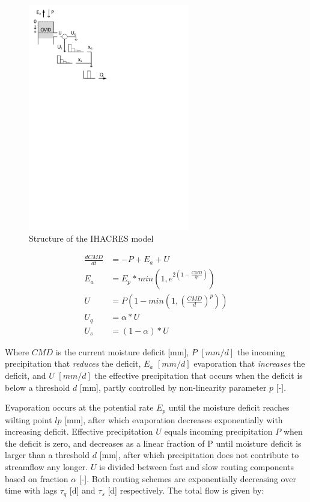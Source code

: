 { 																	%
\begin{figure}
\includegraphics[trim=1cm 20cm 7cm 1cm,width=7cm,keepaspectratio]{./AppA_files/05_schematic.pdf}
\caption{Structure of the IHACRES model} \label{fig:05_schematic}
\end{figure}

\begin{align}
	\frac{dCMD}{dt} &= -P+E_a+U \\
	E_a &= E_p *min\left(1,e^{2\left(1-\frac{CMD}{lp}\right)}\right) \\
	U &= P\left(1-min\left(1,\left(\frac{CMD}{d}\right)^p\right)\right) \\
	U_q &= \alpha *U\\
	U_s &= (1-\alpha)*U
\end{align}

Where $CMD$ is the current moisture deficit [mm], $P$ $[mm/d]$ the incoming precipitation that \emph{reduces} the deficit, $E_a$ $[mm/d]$ evaporation that \emph{increases} the deficit, and $U$ $[mm/d]$ the effective precipitation that occurs when the deficit is below a threshold $d$ [mm], partly controlled by non-linearity parameter $p$ [-].

}

Evaporation occurs at the potential rate $E_p$ until the moisture deficit reaches wilting point $lp$ [mm], after which evaporation decreases exponentially with increasing deficit. Effective precipitation $U$ equals incoming precipitation $P$ when the deficit is zero, and decreases as a linear fraction of P until moisture deficit is larger than a threshold $d$ [mm], after which precipitation does not contribute to streamflow any longer. $U$ is divided between fast and slow routing components based on fraction $\alpha$ [-]. Both routing schemes are exponentially decreasing over time with lags $\tau_q$ [d] and $\tau_s$ [d] respectively. The total flow is given by:

